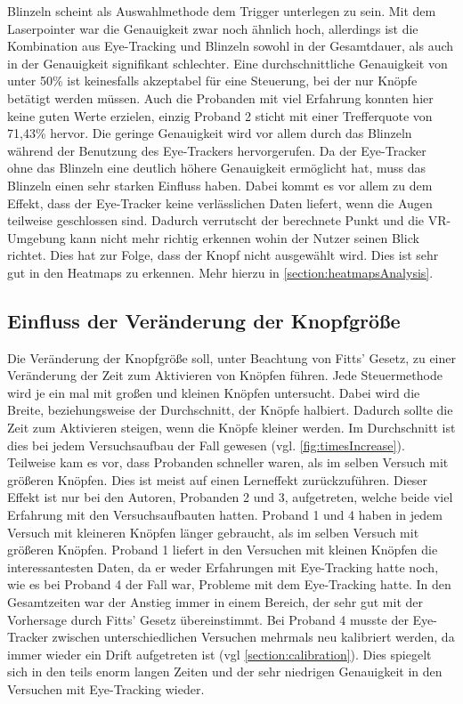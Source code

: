 Blinzeln scheint als Auswahlmethode dem Trigger unterlegen zu sein. Mit dem Laserpointer war die Genauigkeit zwar noch ähnlich hoch, allerdings ist die Kombination aus Eye-Tracking und Blinzeln sowohl in der Gesamtdauer, als auch in der Genauigkeit signifikant schlechter. Eine durchschnittliche Genauigkeit von unter 50\% ist keinesfalls akzeptabel für eine Steuerung, bei der nur Knöpfe betätigt werden müssen. Auch die Probanden mit viel Erfahrung konnten hier keine guten Werte erzielen, einzig Proband 2 sticht mit einer Trefferquote von 71,43\% hervor. Die geringe Genauigkeit wird vor allem durch das Blinzeln während der Benutzung des Eye-Trackers hervorgerufen. Da der Eye-Tracker ohne das Blinzeln eine deutlich höhere Genauigkeit ermöglicht hat, muss das Blinzeln einen sehr starken Einfluss haben. Dabei kommt es vor allem zu dem Effekt, dass der Eye-Tracker keine verlässlichen Daten liefert, wenn die Augen teilweise geschlossen sind. Dadurch verrutscht der berechnete Punkt und die VR-Umgebung kann nicht mehr richtig erkennen wohin der Nutzer seinen Blick richtet. Dies hat zur Folge, dass der Knopf nicht ausgewählt wird. Dies ist sehr gut in den Heatmaps zu erkennen. Mehr hierzu in \autoref{section:heatmapsAnalysis}. 

\subsection{Einfluss der Veränderung der Knopfgröße}
Die Veränderung der Knopfgröße soll, unter Beachtung von Fitts' Gesetz, zu einer Veränderung der Zeit zum Aktivieren von Knöpfen führen. Jede Steuermethode wird je ein mal mit großen und kleinen Knöpfen untersucht. Dabei wird die Breite, beziehungsweise der Durchschnitt, der Knöpfe halbiert. Dadurch sollte die Zeit zum Aktivieren steigen, wenn die Knöpfe kleiner werden. Im Durchschnitt ist dies bei jedem Versuchsaufbau der Fall gewesen (vgl. \autoref{fig:timesIncrease}). Teilweise kam es vor, dass Probanden schneller waren, als im selben Versuch mit größeren Knöpfen. Dies ist meist auf einen Lerneffekt zurückzuführen. Dieser Effekt ist nur bei den Autoren, Probanden 2 und 3, aufgetreten, welche beide viel Erfahrung mit den Versuchsaufbauten hatten. Proband 1 und 4 haben in jedem Versuch mit kleineren Knöpfen länger gebraucht, als im selben Versuch mit größeren Knöpfen. Proband 1 liefert in den Versuchen mit kleinen Knöpfen die interessantesten Daten, da er weder Erfahrungen mit Eye-Tracking hatte noch, wie es bei Proband 4 der Fall war, Probleme mit dem Eye-Tracking hatte. In den Gesamtzeiten war der Anstieg immer in einem Bereich, der sehr gut mit der Vorhersage durch Fitts' Gesetz übereinstimmt. Bei Proband 4 musste der Eye-Tracker zwischen unterschiedlichen Versuchen mehrmals neu kalibriert werden, da immer wieder ein Drift aufgetreten ist (vgl \autoref{section:calibration}). Dies spiegelt sich in den teils enorm langen Zeiten und der sehr niedrigen Genauigkeit in den Versuchen mit Eye-Tracking wieder. 

